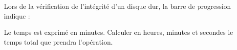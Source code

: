 
\begin{exercice}\label{exosmath-0296}

    Lors de la vérification de l'intégrité d'un disque dur, la barre de progression indique :
    \begin{quote}
    \end{quote}
    Le temps est exprimé en minutes. Calculer en heures, minutes et secondes le temps total que prendra l'opération.

\end{exercice}
